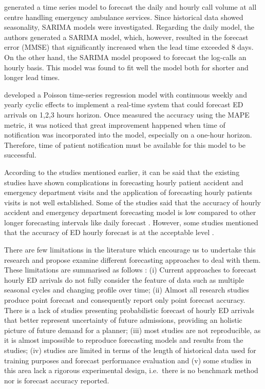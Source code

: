 \documentclass[]{elsarticle} %
\begin{document}
\citet{gijo2016sarima} generated a time series model to forecast the daily and hourly call volume at all centre handling emergency ambulance services. Since historical data showed seasonality, SARIMA models were investigated. Regarding the daily model, the authors generated a SARIMA model, which, however, resulted in the forecast error (MMSE) that significantly increased when the lead time exceeded 8 days. On the other hand, the SARIMA model proposed to forecast the log-calls an hourly basis. This model was found to fit well the model both for shorter and longer lead times.

\citet{asheim2019real} developed a Poisson time-series regression model with continuous weekly and yearly cyclic effects to implement a real-time system that could forecast ED arrivals on 1,2,3 hours horizon. Once measured the accuracy using the MAPE metric, it was noticed that great improvement happened when time of notification was incorporated into the model, especially on a one-hour horizon. Therefore, time of patient notification must be available for this model to be successful.

According to the studies mentioned earlier, it can be said that the existing studies have shown complications in forecasting hourly patient accident and emergency department visits and the application of forecasting hourly patients visits is not well established. Some of the studies said that the accuracy of hourly accident and emergency department forecasting model is low compared to other longer forecasting intervals like daily forecast \citep{boyle2012predicting, hertzum2017forecasting}. However, some studies mentioned that the accuracy of ED hourly forecast is at the acceptable level \citep{choudhury2020forecasting, mccarthy2008challenge, schweigler2009forecasting}.

There are few limitations in the literature which encourage us to undertake this research and propose examine different forecasting approaches to deal with them. These limitations are summarised as follows : (i) Current approaches to forecast hourly ED arrivals do not fully consider the feature of data such as multiple seasonal cycles and changing profile over time; (ii) Almost all research studies produce point forecast and consequently report only point forecast accuracy. There is a lack of studies presenting probabilistic forecast of hourly ED arrivals that better represent uncertainty of future admissions, providing an holistic picture of future demand for a planner; (iii) most studies are not reproducible, as it is almost impossible to reproduce forecasting models and results from the studies; (iv) studies are limited in terms of the length of historical data used for training purposes and forecast performance evaluation and (v) some studies in this area lack a rigorous experimental design, i.e.~there is no benchmark method nor is forecast accuracy reported.
\end{document}
